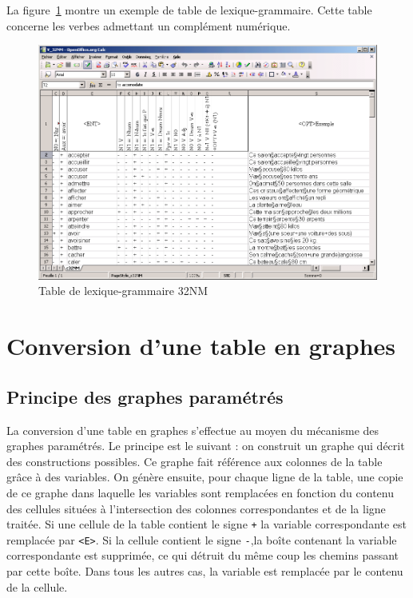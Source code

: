 \bigskip
\noindent La figure~\ref{fig-table-32NM} montre un exemple de table de lexique-grammaire. Cette
table concerne les verbes admettant un complément numérique.


\begin{figure}[!h]
\begin{center}
\includegraphics[width=15cm]{resources/img/fig8-1.png}
\caption{Table de lexique-grammaire 32NM\label{fig-table-32NM}}
\end{center}
\end{figure}

\section{Conversion d’une table en graphes}
\subsection{Principe des graphes paramétrés}
La conversion d’une table en graphes s’effectue au moyen du mécanisme des graphes
paramétrés. Le principe est le suivant : on construit un graphe qui décrit des constructions
possibles. Ce graphe fait référence aux colonnes de la table grâce à des variables. On génère
ensuite, pour chaque ligne de la table, une copie de ce graphe dans laquelle les variables
sont remplacées en fonction du contenu des cellules situées à l’intersection des colonnes
correspondantes et de la ligne traitée. Si une cellule de la table contient le signe
 \verb$+$ la variable correspondante est remplacée par \verb+<E>+. Si la cellule contient le signe
\verb+-+,la boîte contenant la variable correspondante est supprimée, ce qui détruit du même coup
les chemins passant par cette boîte. Dans tous les autres cas, la variable est remplacée par le
contenu de la cellule.



